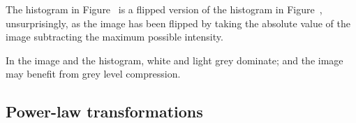 \documentclass[article, 1.5space, letterpaper, 12pt, oneside, header, footer]{SydeClass}
\begin{document}
The histogram in Figure~\label{fig:hist-neg} is a flipped version of the histogram in Figure~\label{fig:hist-original}, unsurprisingly, as the image has been flipped by taking the absolute value of the image subtracting the maximum possible intensity.

In the image and the histogram, white and light grey dominate; and the image may benefit from grey level compression.

\subsection{Power-law transformations}

\begin{figure}[ht]
\centering
\end{figure}
\end{document}
